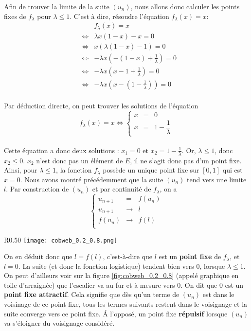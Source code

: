 Afin de trouver la limite de la suite $(u_n)$, nous allons donc calculer les points fixes de $f_\lambda$ pour $\lambda \leq 1$. C'est à dire, résoudre l'équation $f_\lambda(x) = x$:
\[
    \begin{array}{rcl}
        && f_\lambda(x) = x \\
        &\Longleftrightarrow& \lambda x(1-x)-x = 0 \\
        &\Longleftrightarrow& x(\lambda(1-x)-1) = 0 \\
        &\Longleftrightarrow& -\lambda x(-(1-x)+\frac{1}{\lambda}) = 0 \\
        &\Longleftrightarrow& -\lambda x(x-1+\frac{1}{\lambda}) = 0 \\
        &\Longleftrightarrow& -\lambda x(x-(1-\frac{1}{\lambda})) = 0 \\
    \end{array}
\]

Par déduction directe, on peut trouver les solutions de l'équation
$$
    f_\lambda(x) = x \Longleftrightarrow \left\{
            \begin{array}{rcl}
                    x &=& 0 \\
                    x &=& 1 - \dfrac{1}{\lambda}
            \end{array}
        \right.
$$
\vspace{1cm} \\
Cette équation a donc deux solutions : $x_1 = 0$ et $x_2 = 1 - \frac{1}{\lambda}$. Or, $\lambda \leq 1$, donc $x_2 \leq 0$. $x_2$ n'est donc pas un élément de $E$, il ne s'agit donc pas d'un point fixe. Ainsi, pour $\lambda \leq 1$, la fonction $f_\lambda$ possède un unique point fixe sur $[0,1]$ qui est $x = 0$. Nous avons montré précédemment que la suite $(u_n)$ tend vers une limite $l$. Par construction de $(u_n)$ et par continuité de $f_\lambda$, on a 
$$
    \left\{
        \begin{array}{rcl}
                u_{n+1} &=& f(u_n) \\
                u_{n+1} &\longrightarrow& l \\
                f(u_n)  &\longrightarrow& f(l) \\
        \end{array}
    \right.
$$

\begin{wrapfigure}{R}{0.50\textwidth}
    \centering
    \texttt{[image: cobweb\_0.2\_0.8.png]}
    \caption{\label{fig:cobweb_0.2_0.8}$\lambda = 0.8$ et $u_0 = 0.2$}
\end{wrapfigure}
On en déduit donc que $l = f(l)$, c'est-à-dire que $l$ est un \textbf{point fixe} de $f_\lambda$, et $l=0$. La suite (et donc la fonction logistique) tendent bien vers 0, lorsque $\lambda \leq 1$. On peut d'ailleurs voir sur la figure \ref{fig:cobweb_0.2_0.8} (appelé graphique en toile d'arraignée) que l'escalier va au fur et à mesure vers $0$. On dit que $0$ est un \textbf{point fixe attractif}. Cela signifie que dès qu'un terme de $(u_n)$ est dans le voisinage de ce point fixe, tous les termes suivants restent dans le voisignage et la suite converge vers ce point fixe. \'A l'opposé, un point fixe \textbf{répulsif} lorsque $(u_n)$ va s'éloigner du voisignage considéré.

